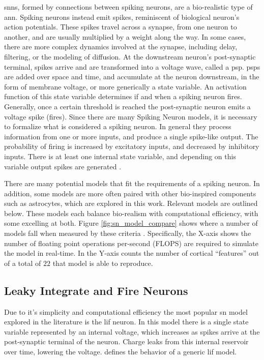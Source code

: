     \glspl{snn}, formed by connections between spiking neurons, are a
    bio-realistic type of \gls{ann}. Spiking neurons instead emit spikes,
    reminiscent of biological neuron's action potentials. These spikes travel
    across a synapse, from one neuron to another, and are usually multiplied by
    a weight along the way. In some cases, there are more complex dynamics
    involved at the synapse, including delay, filtering, or the modeling of
    diffusion. At the downstream neuron's post-synaptic terminal, spikes arrive
    and are transformed into a voltage wave, called a \gls{psp}. \glspl{psp} are
    added over space and time, and accumulate at the neuron downstream, in the
    form of membrane voltage, or more generically a state variable. An
    activation function of this state variable determines if and when a spiking
    neuron fires. Generally, once a certain threshold is reached the
    post-synaptic neuron emits a voltage spike (fires). Since there are many
    Spiking Neuron models, it is necessary to formalize what is considered a
    spiking neuron. In general they process information from one or more inputs,
    and produce a single spike-like output. The probability of firing is
    increased by excitatory inputs, and decreased by inhibitory inputs. There is
    at least one internal state variable, and depending on this variable output
    spikes are generated \parencite{ponulak_2011}.
    
    There are many potential models that fit the requirements of a spiking
    neuron. In addition, some models are more often paired with other
    bio-inspired components such as astrocytes, which are explored in this
    work. Relevant models are outlined below. These models each balance
    bio-realism with computational efficiency, with some excelling at
    both. Figure \ref{fig:sn_model_compare} shows where a number of models fall
    when measured by these criteria \parencite{izhikevich_2004}. Specifically, the
    X-axis shows the number of floating point operations per-second (FLOPS) are
    required to simulate the model in real-time. In the Y-axis counts the number
    of cortical ``features'' out of a total of $22$ that model is able to
    reproduce.
    

    \subsection{Leaky Integrate and Fire Neurons}
    Due to it's simplicity and computational efficiency the most popular
    \gls{sn} model explored in the literature is the \gls{lif} neuron. In this
    model there is a single state variable represented by an internal voltage,
    which increases as spikes arrive at the post-synaptic terminal of the
    neuron. Charge leaks from this internal reservoir over time, lowering the
    voltage.  defines the behavior of a generic \gls{lif} model.

